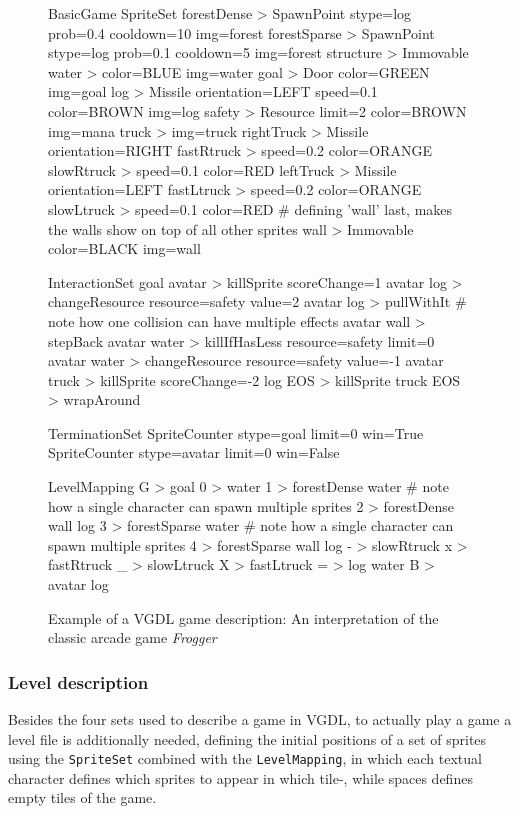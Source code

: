 \documentclass[a4paper,titlepage,final]{report}
\begin{document}
\begin{figure}[!ht]
\centering
\begin{vgdldesc}[linewidth=14cm]
BasicGame
    SpriteSet
        forestDense > SpawnPoint stype=log prob=0.4  cooldown=10 img=forest
        forestSparse > SpawnPoint stype=log prob=0.1  cooldown=5 img=forest
        structure > Immovable
            water > color=BLUE img=water
            goal  > Door color=GREEN img=goal
        log    > Missile   orientation=LEFT  speed=0.1 color=BROWN img=log
        safety > Resource  limit=2 color=BROWN img=mana
        truck  > img=truck
            rightTruck  > Missile   orientation=RIGHT 
                fastRtruck  > speed=0.2  color=ORANGE
                slowRtruck  > speed=0.1  color=RED
            leftTruck  > Missile   orientation=LEFT
                fastLtruck  > speed=0.2  color=ORANGE
                slowLtruck  > speed=0.1  color=RED
        # defining 'wall' last, makes the walls show on top of all other sprites
        wall > Immovable color=BLACK img=wall
        
    InteractionSet
        goal avatar  > killSprite scoreChange=1
        avatar log   > changeResource resource=safety value=2
        avatar log   > pullWithIt   # note how one collision can have multiple effects
        avatar wall  > stepBack
        avatar water > killIfHasLess  resource=safety limit=0
        avatar water > changeResource resource=safety value=-1
        avatar truck > killSprite scoreChange=-2
        log    EOS   > killSprite
        truck  EOS   > wrapAround
    
    TerminationSet
        SpriteCounter stype=goal   limit=0 win=True
        SpriteCounter stype=avatar limit=0 win=False
    
    LevelMapping
        G > goal
        0 > water
        1 > forestDense water       # note how a single character can spawn multiple sprites
        2 > forestDense wall log
        3 > forestSparse water       # note how a single character can spawn multiple sprites
        4 > forestSparse wall log
        - > slowRtruck
        x > fastRtruck
        _ > slowLtruck
        X > fastLtruck
        = > log water
        B > avatar log
\end{vgdldesc}
\caption{Example of a VGDL game description: An interpretation of the classic arcade game \textit{Frogger}}
\label{fig:vgdlgame}
\end{figure}

\subsubsection*{Level description}
Besides the four sets used to describe a game in VGDL, to actually play a game a level file is additionally needed, defining the initial positions of a set of sprites using the \texttt{SpriteSet} combined with the \texttt{LevelMapping}, in which each textual character defines which sprites to appear in which tile-, while spaces defines empty tiles of the game.
\end{document}
